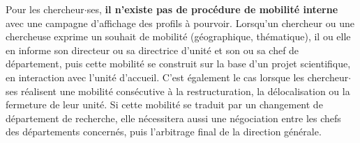 Pour les chercheur$\cdot$ses, {\bf il n'existe pas de proc\'edure de mobilit\'e interne} avec une campagne d'affichage des profils \`a pourvoir. Lorsqu'un chercheur ou une chercheuse exprime un souhait de mobilit\'e (g\'eographique, th\'ematique), il ou elle en informe son directeur ou sa directrice d'unit\'e et son ou sa chef de d\'epartement, puis cette mobilit\'e se construit sur la base d'un projet scientifique, en interaction avec l'unit\'e d'accueil. C'est \'egalement le cas lorsque les chercheur$\cdot$ses r\'ealisent une mobilit\'e cons\'ecutive \`a la restructuration, la d\'elocalisation ou la fermeture de leur unit\'e. Si cette mobilit\'e se traduit par un changement de d\'epartement de recherche, elle n\'ecessitera aussi une n\'egociation entre les chefs des d\'epartements concern\'es, puis l'arbitrage final de la direction g\'en\'erale.
